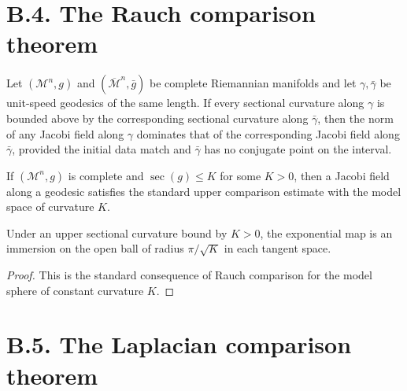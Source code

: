 \section*{B.4. The Rauch comparison theorem}

\begin{theorem}
\label{appb-thm-rauch-comparison}
Let $(\mathcal M^n,g)$ and $(\overline{\mathcal M}^n,\bar g)$ be complete Riemannian manifolds and let $\gamma,\bar\gamma$ be unit-speed geodesics of the same length. If every sectional curvature along $\gamma$ is bounded above by the corresponding sectional curvature along $\bar\gamma$, then the norm of any Jacobi field along $\gamma$ dominates that of the corresponding Jacobi field along $\bar\gamma$, provided the initial data match and $\bar\gamma$ has no conjugate point on the interval.
\end{theorem}

\begin{corollary}
\label{appb-cor-rauch-nonpositive-model}
If $(\mathcal M^n,g)$ is complete and $\sec(g)\le K$ for some $K>0$, then a Jacobi field along a geodesic satisfies the standard upper comparison estimate with the model space of curvature $K$.
\end{corollary}

\begin{corollary}
\label{appb-cor-rauch-injectivity-radius}
Under an upper sectional curvature bound by $K>0$, the exponential map is an immersion on the open ball of radius $\pi/\sqrt K$ in each tangent space.
\end{corollary}

\begin{proof}
\sketch This is the standard consequence of Rauch comparison for the model sphere of constant curvature $K$.
\end{proof}

\section*{B.5. The Laplacian comparison theorem}

